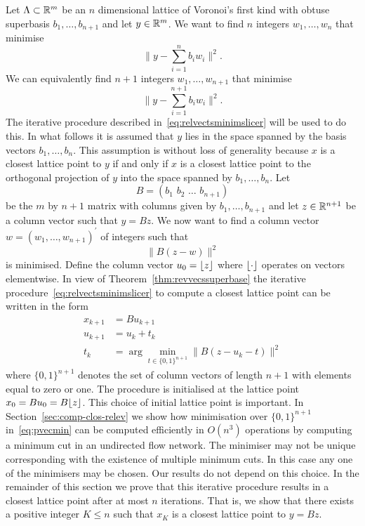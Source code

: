\documentclass[final,leqno]{siamltex}
\begin{document}
Let $\Lambda \subset {\mathbb R}^m$ be an $n$ dimensional lattice of Voronoi's first kind with obtuse superbasis $b_1,\dots,b_{n+1}$ and let $y \in {\mathbb R}^m$.  We want to find $n$ integers $w_1,\dots,w_n$ that minimise
\[
\| y - \sum_{i=1}^n b_i w_i \|^2.
\]
We can equivalently find $n+1$ integers $w_1,\dots,w_{n+1}$ that minimise
\[
\| y - \sum_{i=1}^{n+1} b_i w_i \|^2.
\]
The iterative procedure described in~\eqref{eq:relvectsminimslicer} will be used to do this.  In what follows it is assumed that $y$ lies in the space spanned by the basis vectors $b_1,\dots,b_{n}$.  This assumption is without loss of generality because $x$ is a closest lattice point to $y$ if and only if $x$ is a closest lattice point to the orthogonal projection of $y$ into the space spanned by $b_1,\dots,b_{n}$.  Let
\[
B = (b_1\,\,b_2\,\,\dots\,\,b_{n+1})
\]
be the $m$ by $n+1$ matrix with columns given by $b_1,\dots,b_{n+1}$ and let $z \in {\mathbb R}^{n+1}$ be a column vector such that $y = Bz$.  We now want to find a column vector $w = (w_1,\dots,w_{n+1})^\prime$ of integers such that
\begin{equation}\label{eq:tominimise}
\| B(z  -  w) \|^2
\end{equation}
is minimised.  Define the column vector $u_0 = {\left\lfloor z \right\rfloor}$ where ${\left\lfloor \cdot \right\rfloor}$ operates on vectors elementwise. In view of Theorem~\ref{thm:revvecssuperbase} the iterative procedure~\eqref{eq:relvectsminimslicer} to compute a closest lattice point can be written in the form
\begin{align}
x_{k+1} &= B u_{k+1} \label{eq:xseqfirsttype}  \\
u_{k+1} &= u_k + t_k \nonumber \\
t_k &= \arg\min_{t \in \{0,1\}^{n+1}}\| B(z - u_k - t) \|^2 \label{eq:pvecmin}
\end{align}
where $\{0,1\}^{n+1}$ denotes the set of column vectors of length $n+1$ with elements equal to zero or one.  The procedure is initialised at the lattice point $x_0 = Bu_0 = B{\left\lfloor z \right\rfloor}$.  This choice of initial lattice point is important.  In Section~\ref{sec:comp-clos-relev} we show how minimisation over $\{0,1\}^{n+1}$ in~\eqref{eq:pvecmin} can be computed efficiently in $O(n^3)$ operations by computing a minimum cut in an undirected flow network.  The minimiser may not be unique corresponding with the existence of multiple minimum cuts.  In this case any one of the minimisers may be chosen.  Our results do not depend on this choice.   In the remainder of this section we prove that this iterative procedure results in a closest lattice point after at most $n$ iterations.  That is, we show that there exists a positive integer $K \leq n$ such that $x_K$ is a closest lattice point to $y = Bz$.
\end{document}

